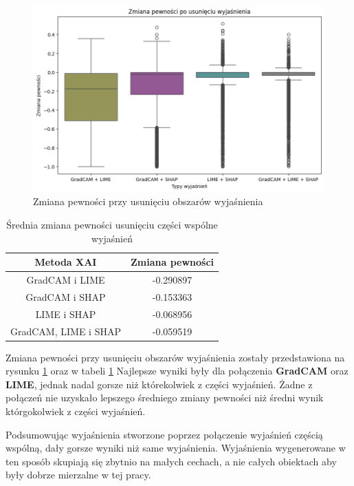 \begin{figure}[h]
	\centering\includegraphics[width=.9\textwidth]{img/combine_confidence_no_exp_and}
	\caption{Zmiana pewności przy usunięciu obszarów wyjaśnienia}  \label{rys:combineandconfidenceandno}
\end{figure}
\begin{table}
	\centering
	\begin{tabular}{|c|c|}
		\hline
		\textbf{Metoda XAI}  & Zmiana pewności \\
		\hline
		GradCAM i LIME       & -0.290897       \\
		\hline
		GradCAM i SHAP       & -0.153363       \\
		\hline
		LIME i SHAP          & -0.068956       \\
		\hline
		GradCAM, LIME i SHAP & -0.059519       \\
		\hline
	\end{tabular}
	\caption{Średnia zmiana pewności usunięciu części wspólne wyjaśnień}
	\label{tab:combineandconfidenceandno}
\end{table}
Zmiana pewności przy usunięciu obszarów wyjaśnienia zostały przedstawiona na rysunku \ref{rys:combineandconfidenceandno} oraz w tabeli \ref{tab:combineandconfidenceandno}
Najlepsze wyniki były dla połączenia \textbf{GradCAM} oraz \textbf{LIME}, jednak nadal gorsze niż którekolwiek z części wyjaśnień.
Żadne z połączeń nie uzyskało lepszego średniego zmiany pewności niż średni wynik którgokolwiek z części wyjaśnień.

\vspace{1cm}
Podsumowując wyjaśnienia stworzone poprzez połączenie wyjaśnień częścią wspólną, dały gorsze wyniki niż same wyjaśnienia.
Wyjaśnienia wygenerowane w ten sposób skupiają się zbytnio na małych cechach, a nie całych obiektach aby były dobrze mierzalne w tej pracy.

